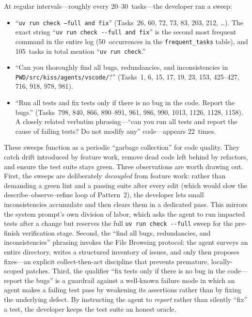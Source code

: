 \documentclass{article}
\begin{document}
At regular intervals---roughly every 20--30~tasks---the developer ran
a sweep:

\begin{itemize}[nosep]
  \item ``\texttt{uv run check --full and fix}''
        (Tasks~26, 60, 72, 73, 83, 203, 212, \ldots).
        The exact string ``\texttt{uv run check -{}-full and fix}''
        is the second most frequent command in the entire log
        (50~occurrences in the \texttt{frequent\_tasks} table), and
        105~tasks in total mention ``\texttt{uv run check}.''
  \item ``Can you thoroughly find all bugs, redundancies, and
        inconsistencies in \texttt{PWD/src/kiss/agents/vscode/}?''
        (Tasks~1, 6, 15, 17, 19, 23, 153, 425--427, 716, 918, 978, 981).
  \item ``Run all tests and fix tests only if there is no bug in
        the code.  Report the bugs.''
        (Tasks~798, 840, 866, 890--891, 961, 986, 990, 1013, 1126, 1128, 1158).
        A closely related verbatim phrasing---``can you run all tests
        and report the cause of failing tests?  Do not modify any''
        code---appears 22~times.
\end{itemize}

These sweeps function as a periodic ``garbage collection'' for code
quality.
They catch drift introduced by feature work, remove dead code left
behind by refactors, and ensure the test suite stays green.
Three observations are worth drawing out.
First, the sweeps are deliberately \emph{decoupled} from feature work:
rather than demanding a green lint and a passing suite after every
edit (which would slow the describe--observe--refine loop of
Pattern~2), the developer lets small inconsistencies accumulate and
then clears them in a dedicated pass.
This mirrors the system prompt's own division of labor, which asks the
agent to run impacted tests after a change but reserves the full
\texttt{uv run check -{}-full} sweep for the pre-finish verification
stage.
Second, the ``find all bugs, redundancies, and inconsistencies''
phrasing invokes the File Browsing protocol: the agent surveys an
entire directory, writes a structured inventory of issues, and only
then proposes fixes---an explicit collect-then-act discipline that
prevents premature, locally-scoped patches.
Third, the qualifier ``fix tests only if there is no bug in the
code---report the bugs'' is a guardrail against a well-known
failure mode in which an agent makes a failing test pass by weakening
its assertions rather than by fixing the underlying defect.
By instructing the agent to \emph{report} rather than silently
``fix'' a test, the developer keeps the test suite an honest oracle.
\end{document}
